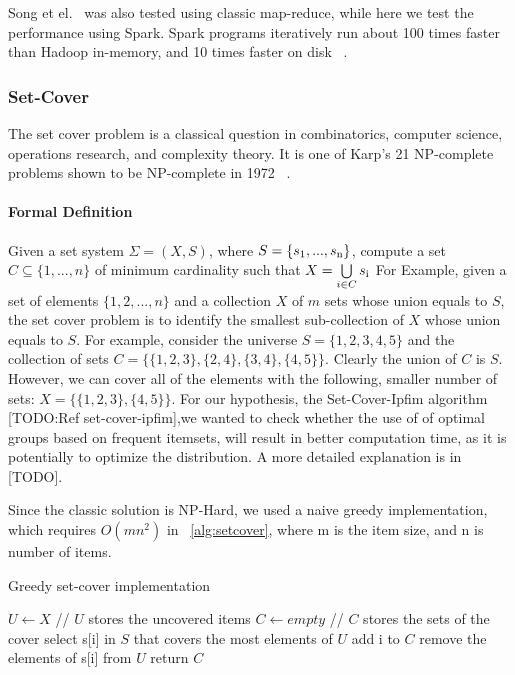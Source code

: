 Song et el.~\cite{song2017} was also tested using classic map-reduce, while here we test the performance using Spark. Spark programs iteratively run about 100 times faster than Hadoop in-memory, and 10 times faster on disk ~\cite{spark}.

\subsubsection{Set-Cover}
The set cover problem is a classical question in combinatorics, computer science, operations research, and complexity theory. It is one of Karp's 21 NP-complete problems shown to be NP-complete in 1972 ~\cite{setcoveralgo}.

\paragraph{Formal Definition} Given a set system $ \Sigma = (X, S)$, where $S = \{s \textsubscript{1}, . . . , s\textsubscript{n}\}$, compute a set $C \subseteq \{1, . . . , n\}$ of minimum cardinality such that $X = \bigcup\limits_{i \in C} s \textsubscript{i}\\ $ 
For Example, given a set of elements $ \displaystyle \{1,2,...,n\}$ and a collection $X$ of $\displaystyle m$ sets whose union equals to $S$, the set cover problem is to identify the smallest sub-collection of $\displaystyle X$ whose union equals to $S$. For example, consider the universe $\displaystyle S=\{1,2,3,4,5\}$ and the collection of sets $\displaystyle C=\{\{1,2,3\},\{2,4\},\{3,4\},\{4,5\}\}$. Clearly the union of $\displaystyle C$ is $\displaystyle S$. However, we can cover all of the elements with the following, smaller number of sets: $\displaystyle X= \{\{1,2,3\},\{4,5\}\}$.
For our hypothesis, the Set-Cover-Ipfim algorithm [TODO:Ref set-cover-ipfim],we wanted to check whether the use of of optimal groups based on frequent itemsets, will result in better computation time, as it is potentially to optimize the distribution. A more detailed explanation is in [TODO].

Since the classic solution is NP-Hard, we used a naive greedy implementation, which requires $ O(mn^2) $ in ~\ref{alg:setcover}, where m is the item size, and n is number of items.

\begin{algorithm}
  \caption{Greedy set-cover implementation}\label{setcover}
  \begin{algorithmic}[1]
   \label{alg:setcover}
      \State $U \gets X$  // $U$ stores the uncovered items
      \State $C \gets empty$ // $C$ stores the sets of the cover
        \State select s[i] in $S$ that covers the most elements of $U$
		\State add i to $C$
		\State remove the elements of s[i] from $U$
      \EndWhile
 	\State return $C$
    \EndProcedure
  \end{algorithmic}
\end{algorithm}
